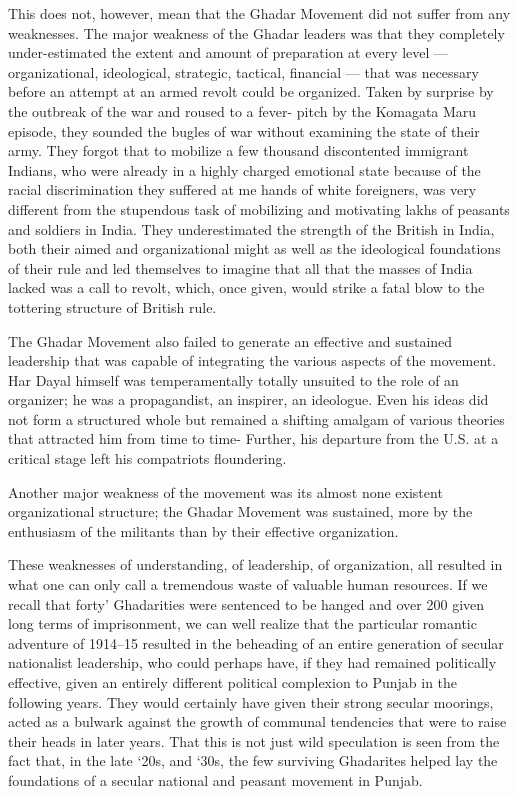 This does not, however, mean that the Ghadar Movement did not suffer from any weaknesses. The major weakness of the Ghadar leaders was that they completely under-estimated the extent and amount of preparation at every level --- organizational, ideological, strategic, tactical, financial --- that was necessary before an attempt at an armed revolt could be organized. Taken by surprise by the outbreak of the war and roused to a fever- pitch by the Komagata Maru episode, they sounded the bugles of war without examining the state of their army. They forgot that to mobilize a few thousand discontented immigrant Indians, who were already in a highly charged emotional state because of the racial discrimination they suffered at me hands of white foreigners, was very different from the stupendous task of mobilizing and motivating lakhs of peasants and soldiers in India. They underestimated the strength of the British in India, both their aimed and organizational might as well as the ideological foundations of their rule and led themselves to imagine that all that the masses of India lacked was a call to revolt, which, once given, would strike a fatal blow to the tottering structure of British rule.

The Ghadar Movement also failed to generate an effective and sustained leadership that was capable of integrating the various aspects of the movement. Har Dayal himself was temperamentally totally unsuited to the role of an organizer; he was a propagandist, an inspirer, an ideologue. Even his ideas did not form a structured whole but remained a shifting amalgam of various theories that attracted him from time to time- Further, his departure from the U.S. at a critical stage left his compatriots floundering.

Another major weakness of the movement was its almost none existent organizational structure; the Ghadar Movement was sustained, more by the enthusiasm of the militants than by their effective organization.

These weaknesses of understanding, of leadership, of organization, all resulted in what one can only call a tremendous waste of valuable human resources. If we recall that forty' Ghadarities were sentenced to be hanged and over 200 given long terms of imprisonment, we can well realize that the particular romantic adventure of 1914--15 resulted in the beheading of an entire generation of secular nationalist leadership, who could perhaps have, if they had remained politically effective, given an entirely different political complexion to Punjab in the following years. They would certainly have given their strong secular moorings, acted as a bulwark against the growth of communal tendencies that were to raise their heads in later years. That this is not just wild speculation is seen from the fact that, in the late `20s, and `30s, the few surviving Ghadarites helped lay the foundations of a secular national and peasant movement in Punjab.
